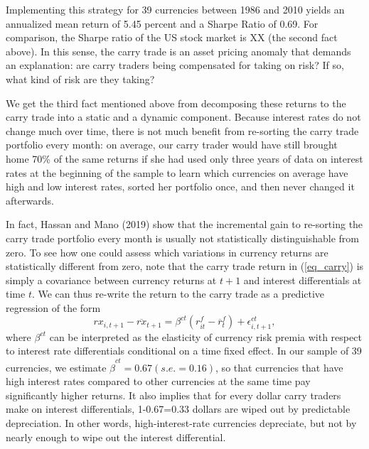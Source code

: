 \documentclass{ar-1col}
\begin{document}
Implementing this strategy for 39 currencies between 1986 and 2010
yields an annualized mean return of 5.45 percent and a Sharpe Ratio of
0.69. For comparison, the Sharpe ratio of the US stock market is XX
(the second fact above). In this sense, the carry trade is an asset
pricing anomaly that demands an explanation: are carry traders being
compensated for taking on risk? If so, what kind of risk are they
taking?

We get the third fact mentioned above from decomposing these returns
to the carry trade into a static and a dynamic component. Because
interest rates do not change much over time, there is not much benefit
from re-sorting the carry trade portfolio every month: on average, our
carry trader would have still brought home 70\% of the same returns if
she had used only three years of data on interest rates at the
beginning of the sample to learn which currencies on average have high
and low interest rates, sorted her portfolio once, and then never
changed it afterwards.

In fact, Hassan and Mano (2019) show that the incremental gain to
re-sorting the carry trade portfolio every month is usually not
statistically distinguishable from zero. To see how one could assess
which variations in currency returns are statistically different from
zero, note that the carry trade return in (\ref{eq_carry}) is simply a
covariance between currency returns at $t+1$ and interest
differentials at time $t$. We can thus re-write the return to the
carry trade as a predictive regression of the form \begin{equation}
  rx_{i,t+1}-\overline{rx}_{t+1}=\beta^{ct}\left(
    r^f_{it}-\overline{r}^f_{t}\right) +\epsilon
  _{i,t+1}^{ct}, \label{eq_ct}
\end{equation} 
where $\beta ^{ct}$ can be interpreted as the elasticity of currency
risk premia with respect to interest rate differentials conditional on
a time fixed effect. In our sample of 39 currencies, we estimate
$\hat{\beta}^{ct}=0.67 (s.e.=0.16)$, so that currencies that have high
interest rates compared to other currencies at the same time pay
significantly higher returns. It also implies that for every dollar
carry traders make on interest differentials, 1-0.67=0.33 dollars are
wiped out by predictable depreciation. In other words,
high-interest-rate currencies depreciate, but not by nearly enough to
wipe out the interest differential.
\end{document}

